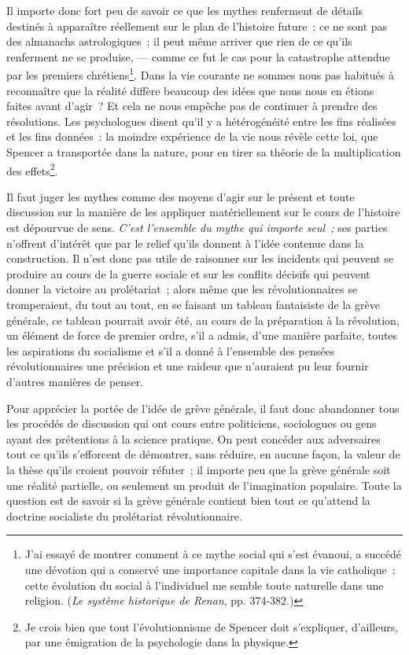 \documentclass[french,twoside]{book} %
\begin{document}
Il importe donc fort peu de savoir ce que les mythes renferment de détails destinés à apparaître réellement sur le plan de l’histoire future ; ce ne sont pas des almanachs astrologiques ; il peut même arriver que rien de ce qu’ils renferment ne se produise, — comme ce fut le cas pour la catastrophe attendue par les premiers chrétiens\footnote{ \noindent J’ai essayé de montrer comment à ce mythe social qui s’est évanoui, a succédé une dévotion qui a conservé une importance capitale dans la vie catholique : cette évolution du social à l’individuel me semble toute naturelle dans une religion. (\emph{Le système historique de Renan}, pp. 374-382.)
 }. Dans la vie courante ne sommes nous pas habitués à  reconnaître que la réalité diffère beaucoup des idées que nous nous en étions faites avant d’agir ? Et cela ne nous empêche pas de continuer à prendre des résolutions. Les psychologues disent qu’il y a hétérogénéité entre les fins réalisées et les fins données : la moindre expérience de la vie nous révèle cette loi, que Spencer a transportée dans la nature, pour en tirer sa théorie de la multiplication des effets\footnote{ \noindent Je crois bien que tout l’évolutionnisme de Spencer doit s’expliquer, d’ailleurs, par une émigration de la psychologie dans la physique.
 }.\par
Il faut juger les mythes comme des moyens d’agir sur le présent et toute discussion sur la manière de les appliquer matériellement sur le cours de l’histoire est dépourvue de sens. \emph{C’est l’ensemble du mythe qui importe seul ;} ses parties n’offrent d’intérêt que par le relief qu’ils donnent à l’idée contenue dans la construction. Il n’est donc pas utile de raisonner sur les incidents qui peuvent se produire au cours de la guerre sociale et sur les conflits décisifs qui peuvent donner la victoire au prolétariat ; alors même que les révolutionnaires se tromperaient, du tout au tout, en se faisant un tableau fantaisiste de la grève générale, ce tableau pourrait avoir été, au cours de la préparation à la révolution, un élément de force de premier ordre, s’il a admis, d’une manière parfaite, toutes les aspirations du socialisme et s’il a donné à l’ensemble des pensées révolutionnaires une précision et une raideur que n’auraient pu leur fournir d’autres manières de penser.\par
Pour apprécier la portée de l’idée de grève générale, il faut donc abandonner tous les procédés de discussion qui  ont cours entre politiciens, sociologues ou gens ayant des prétentions à la science pratique. On peut concéder aux adversaires tout ce qu’ils s’efforcent de démontrer, sans réduire, en aucune façon, la valeur de la thèse qu’ils croient pouvoir réfuter ; il importe peu que la grève générale soit une réalité partielle, ou seulement un produit de l’imagination populaire. Toute la question est de savoir si la grève générale contient bien tout ce qu’attend la doctrine socialiste du prolétariat révolutionnaire.\par
\end{document}
